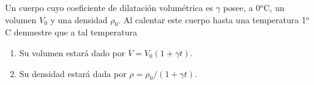 
Un cuerpo cuyo coeficiente de dilatación volumétrica es $\gamma$ posee, a 0$^o$C, un volumen $V_0$ y una densidad $\rho_0$. Al calentar este cuerpo hasta una temperatura 1$^o$C demuestre que a tal temperatura
\begin{enumerate}
    \item Su volumen estará dado por $V = V_0 (1+ \gamma t)$.
    \item Su densidad estará dada por $\rho = \rho_0/(1+ \gamma t)$.
\end{enumerate}